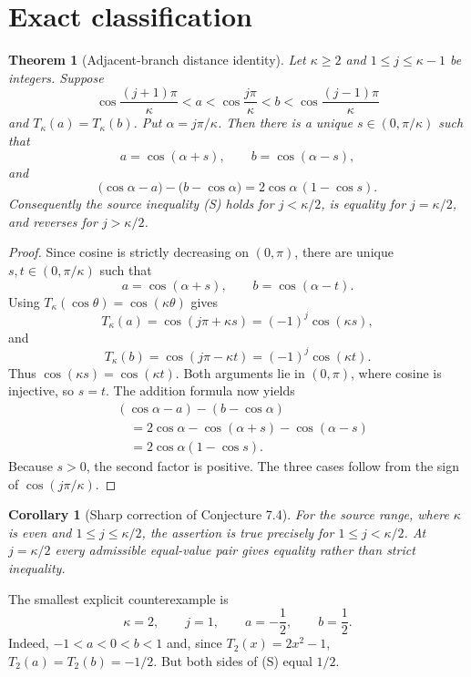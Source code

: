 \documentclass[11pt]{article}
\newtheorem{theorem}{Theorem}
\newtheorem{corollary}{Corollary}
\begin{document}
\section{Exact classification}

\begin{theorem}[Adjacent-branch distance identity]
Let $\kappa\geq2$ and $1\leq j\leq\kappa-1$ be integers.  Suppose
\[
 \cos\!\frac{(j+1)\pi}{\kappa}<a<\cos\!\frac{j\pi}{\kappa}
 <b<\cos\!\frac{(j-1)\pi}{\kappa}
\]
and $T_\kappa(a)=T_\kappa(b)$.  Put $\alpha=j\pi/\kappa$.  Then there is a
unique $s\in(0,\pi/\kappa)$ such that
\[
 a=\cos(\alpha+s),\qquad b=\cos(\alpha-s),
\]
and
\[
 \bigl(\cos\alpha-a\bigr)-\bigl(b-\cos\alpha\bigr)
 =2\cos\alpha\,(1-\cos s). \tag{1}
\]
Consequently the source inequality (S) holds for $j<\kappa/2$, is equality
for $j=\kappa/2$, and reverses for $j>\kappa/2$.
\end{theorem}

\begin{proof}
Since cosine is strictly decreasing on $(0,\pi)$, there are unique
$s,t\in(0,\pi/\kappa)$ such that
\[
 a=\cos(\alpha+s),\qquad b=\cos(\alpha-t).
\]
Using $T_\kappa(\cos\theta)=\cos(\kappa\theta)$ gives
\[
 T_\kappa(a)=\cos(j\pi+\kappa s)=(-1)^j\cos(\kappa s),
\]
and
\[
 T_\kappa(b)=\cos(j\pi-\kappa t)=(-1)^j\cos(\kappa t).
\]
Thus $\cos(\kappa s)=\cos(\kappa t)$.  Both arguments lie in $(0,\pi)$,
where cosine is injective, so $s=t$.  The addition formula now yields
\begin{align*}
 &(\cos\alpha-a)-(b-\cos\alpha)\\
 &\quad=2\cos\alpha-\cos(\alpha+s)-\cos(\alpha-s)\\
 &\quad=2\cos\alpha(1-\cos s).
\end{align*}
Because $s>0$, the second factor is positive.  The three cases follow from
the sign of $\cos(j\pi/\kappa)$.
\end{proof}

\begin{corollary}[Sharp correction of Conjecture 7.4]
For the source range, where $\kappa$ is even and
$1\leq j\leq\kappa/2$, the assertion is true precisely for
$1\leq j<\kappa/2$.  At $j=\kappa/2$ every admissible equal-value pair gives
equality rather than strict inequality.
\end{corollary}

The smallest explicit counterexample is
\[
 \kappa=2,\qquad j=1,\qquad a=-\frac12,\qquad b=\frac12.
\]
Indeed, $-1<a<0<b<1$ and, since $T_2(x)=2x^2-1$,
$T_2(a)=T_2(b)=-1/2$.  But both sides of (S) equal $1/2$.
\end{document}
